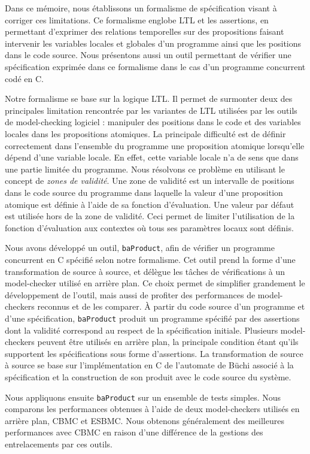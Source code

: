 Dans ce mémoire, nous établissons un formalisme de spécification visant à
corriger ces limitations. Ce formalisme englobe LTL et les assertions, en
permettant d'exprimer des relations temporelles sur des propositions faisant
intervenir les variables locales et globales d'un programme ainsi que les
positions dans le code source. Nous présentons aussi un outil permettant de
vérifier une spécification exprimée dans ce formalisme dans le cas d'un
programme concurrent codé en C.

Notre formalisme se base sur la logique LTL. Il permet de surmonter deux des
principales limitation rencontrée par les variantes de LTL utilisées par les
outils de model-checking logiciel : manipuler des positions dans le code et des
variables locales dans les propositions atomiques. La principale difficulté est
de définir correctement dans l'ensemble du programme une proposition atomique
lorsqu'elle dépend d'une variable locale. En effet, cette variable locale n'a de
sens que dans une partie limitée du programme. Nous résolvons ce problème en
utilisant le concept de \emph{zones de validité}. Une zone de validité est un
intervalle de positions dans le code source du programme dans laquelle la valeur
d'une proposition atomique est définie à l'aide de sa fonction d'évaluation.
Une valeur par défaut est utilisée hors de la zone de validité. Ceci permet de
limiter l'utilisation de la fonction d'évaluation aux contextes où tous ses
paramètres locaux sont définis.

Nous avons développé un outil, \texttt{baProduct}, afin de vérifier un programme
concurrent en C spécifié selon notre formalisme. Cet outil prend la forme d'une
transformation de source à source, et délègue les tâches de vérifications à un
model-checker utilisé en arrière plan. Ce choix permet de simplifier grandement
le développement de l'outil, mais aussi de profiter des performances de
model-checkers reconnus et de les comparer. À partir du code source d'un
programme et d'une spécification, \texttt{baProduct} produit un programme
spécifié par des assertions dont la validité correspond au respect de la
spécification initiale. Plusieurs model-checkers peuvent être utilisés en
arrière plan, la principale condition étant qu'ils supportent les spécifications
sous forme d'assertions. La transformation de source à source se base sur
l'implémentation en C de l'automate de Büchi associé à la spécification et la
construction de son produit avec le code source du système.

Nous appliquons ensuite \texttt{baProduct} sur un ensemble de tests simples.
Nous comparons les performances obtenues à l'aide de deux model-checkers
utilisés en arrière plan, CBMC et ESBMC. Nous obtenons généralement des
meilleures performances avec CBMC en raison d'une différence de la gestions des
entrelacements par ces outils.

